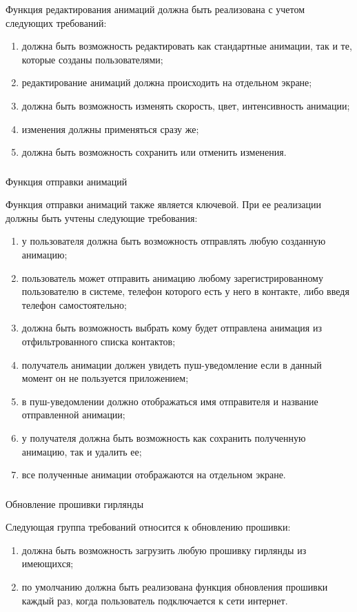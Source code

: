 Функция редактирования анимаций должна быть реализована с учетом следующих требований:

\begin{enumerate}
	\item должна быть возможность редактировать как стандартные анимации, так и те, которые созданы пользователями;
	\item редактирование анимаций должна происходить на отдельном экране;
	\item должна быть возможность изменять скорость, цвет, интенсивность анимации;
	\item изменения должны применяться сразу же;
	\item должна быть возможность сохранить или отменить изменения.
\end{enumerate}

\subsubsection{} Функция отправки анимаций
\label{sec:domain:specification:tasks}

Функция отправки анимаций также является ключевой. При ее реализации должны быть учтены следующие требования:

\begin{enumerate}
	\item у пользователя должна быть возможность отправлять любую созданную анимацию;
	\item пользователь может отправить анимацию любому зарегистрированному пользователю в системе, телефон которого есть у него в контакте, либо введя телефон самостоятельно;
	\item должна быть возможность выбрать кому будет отправлена анимация из отфильтрованного списка контактов;
	\item получатель анимации должен увидеть пуш-уведомление если в данный момент он не пользуется приложением;
    \item в пуш-уведомлении должно отображаться имя отправителя и название отправленной анимации;
    \item у получателя должна быть возможность как сохранить полученную анимацию, так и удалить ее; 
    \item все полученные анимации отображаются на отдельном экране.
\end{enumerate}



\subsubsection{} Обновление прошивки гирлянды
\label{sec:domain:specification:student_history}

Следующая группа требований относится к обновлению прошивки:

\begin{enumerate}
	\item должна быть возможность загрузить любую прошивку гирлянды из имеющихся;
	\item по умолчанию должна быть реализована функция обновления прошивки каждый раз, когда пользователь подключается к сети интернет. 
\end{enumerate}
